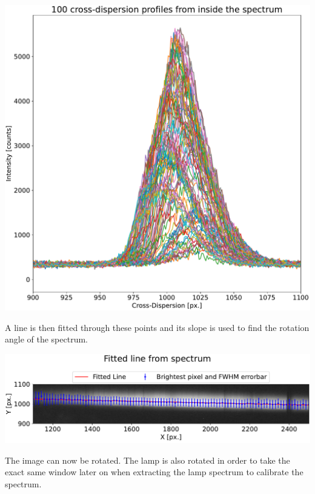 \documentclass[a4paper]{article}
\newenvironment{Figure}
	{\par\medskip\noindent\minipage{\linewidth}}
	{\endminipage\par\medskip}
\begin{document}
\begin{multicols}{2}
			\begin{Figure}
				\centering
				\includegraphics[width=0.98\linewidth]{Rot_ang_profiles.pdf}
				\label{fig:rot_prof}
			\end{Figure}
		
			A line is then fitted through these points and its slope is used to find the rotation angle of the spectrum.
			\begin{Figure}
				\centering
				\includegraphics[width=\linewidth]{Rot_ang_fit.pdf}
				\label{fig:rot_fit}
			\end{Figure}
			
			The image can now be rotated. The lamp is also rotated in order to take the exact same window later on when extracting the lamp spectrum to calibrate the spectrum.\\
		

\end{multicols}
\end{document}

